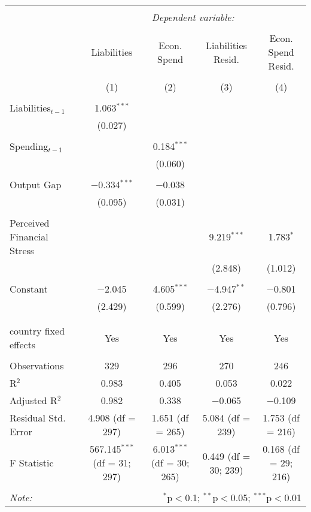 
\begingroup 
\tiny 
\begin{tabular}{@{\extracolsep{5pt}}lcccc} 
\\[-1.8ex]\hline 
\hline \\[-1.8ex] 
 & \multicolumn{4}{c}{\textit{Dependent variable:}} \\ 
\cline{2-5} 
\\[-1.8ex] & Liabilities & Econ. Spend & Liabilities Resid. & Econ. Spend Resid. \\ 
\\[-1.8ex] & (1) & (2) & (3) & (4)\\ 
\hline \\[-1.8ex] 
 Liabilities$_{t-1}$ & 1.063$^{***}$ &  &  &  \\ 
  & (0.027) &  &  &  \\ 
  & & & & \\ 
 Spending$_{t-1}$ &  & 0.184$^{***}$ &  &  \\ 
  &  & (0.060) &  &  \\ 
  & & & & \\ 
 Output Gap & $-$0.334$^{***}$ & $-$0.038 &  &  \\ 
  & (0.095) & (0.031) &  &  \\ 
  & & & & \\ 
 Perceived Financial Stress &  &  & 9.219$^{***}$ & 1.783$^{*}$ \\ 
  &  &  & (2.848) & (1.012) \\ 
  & & & & \\ 
 Constant & $-$2.045 & 4.605$^{***}$ & $-$4.947$^{**}$ & $-$0.801 \\ 
  & (2.429) & (0.599) & (2.276) & (0.796) \\ 
  & & & & \\ 
\hline \\[-1.8ex] 
country fixed effects & Yes & Yes & Yes & Yes \\ 
\hline \\[-1.8ex] 
Observations & 329 & 296 & 270 & 246 \\ 
R$^{2}$ & 0.983 & 0.405 & 0.053 & 0.022 \\ 
Adjusted R$^{2}$ & 0.982 & 0.338 & $-$0.065 & $-$0.109 \\ 
Residual Std. Error & 4.908 (df = 297) & 1.651 (df = 265) & 5.084 (df = 239) & 1.753 (df = 216) \\ 
F Statistic & 567.145$^{***}$ (df = 31; 297) & 6.013$^{***}$ (df = 30; 265) & 0.449 (df = 30; 239) & 0.168 (df = 29; 216) \\ 
\hline 
\hline \\[-1.8ex] 
\textit{Note:}  & \multicolumn{4}{r}{$^{*}$p$<$0.1; $^{**}$p$<$0.05; $^{***}$p$<$0.01} \\ 
\end{tabular} 
\endgroup 
